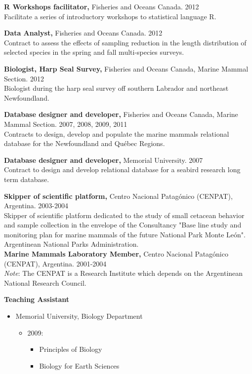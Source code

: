 \documentclass{res}
\begin{document}
\begin{resume}
\textbf{R Workshops facilitator,} Fisheries and Oceans Canada. 2012\\
Facilitate a series of introductory workshops to statistical language R.

\textbf{Data Analyst,} Fisheries and Oceans Canada. 2012\\
Contract to assess the effects of sampling reduction in the length distribution of selected species in the spring and fall multi-species surveys. 

\textbf{Biologist, Harp Seal Survey,} Fisheries and Oceans Canada, Marine Mammal Section. 2012\\
Biologist during the harp seal survey off southern Labrador and northeast Newfoundland.

\textbf{Database designer and developer,} Fisheries and Oceans Canada, Marine Mammal Section. 2007, 2008, 2009, 2011\\
Contracts to design, develop and populate the marine mammals relational database for the Newfoundland and Qu\'{e}bec Regions. 

\textbf{Database designer and developer,} Memorial University. 2007\\
Contract to design and develop relational database for a seabird research long term database. 

\textbf{Skipper of scientific platform,} Centro Nacional Patag\'{o}nico (CENPAT), Argentina. 2003-2004\\
Skipper of scientific platform dedicated to the study of small cetacean behavior and sample collection in the envelope of the Consultancy "Base line study and monitoring plan for marine mammals of the future National Park Monte Le\'{o}n". Argentinean National Parks Administration.\\

\textbf{Marine Mammals Laboratory Member,} Centro Nacional Patag\'{o}nico (CENPAT), Argentina. 2001-2004\\

\textit{Note}: The CENPAT is a Research Institute which depends on the Argentinean National Research Council.

\textbf{Teaching Assistant}
\begin{itemize}
	\item[] Memorial University, Biology Department
	\begin{itemize}
		\item[] 2009:
		\begin{itemize}
			\item[] Principles of Biology
			\item[] Biology for Earth Sciences
		\end{itemize}
	\end{itemize} 


\end{itemize}
\end{resume}
\end{document}
